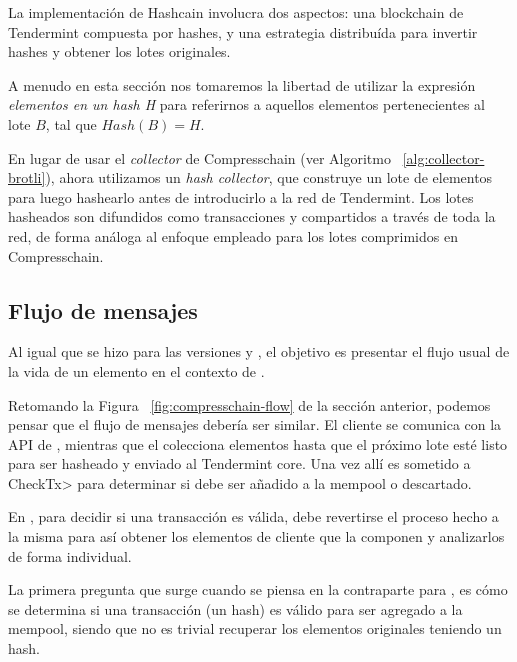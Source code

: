 %
La implementación de Hashcain involucra dos aspectos: una blockchain de Tendermint compuesta por hashes,
y una estrategia distribuída para invertir hashes y obtener los lotes originales.
%

A menudo en esta sección nos tomaremos la libertad de utilizar la expresión \textit{elementos en un hash H}
para referirnos a aquellos elementos pertenecientes al lote $B$, tal que $Hash(B) = H$.

En lugar de usar el \textit{collector} de Compresschain (ver Algoritmo ~\ref{alg:collector-brotli}),
ahora utilizamos un \textit{hash collector}, que construye un lote de elementos para luego hashearlo
antes de introducirlo a la red de Tendermint.
%
Los lotes hasheados son difundidos como transacciones y compartidos a través de toda la red, de forma
análoga al enfoque empleado para los lotes comprimidos en Compresschain.

\subsection{Flujo de mensajes}

Al igual que se hizo para las versiones \vanilla y \compresschain, el objetivo es presentar el flujo usual
de la vida de un elemento en el contexto de \hashchain.

%

Retomando la Figura ~\ref{fig:compresschain-flow} de la sección anterior, podemos pensar que el flujo de mensajes
debería ser similar. El cliente se comunica con la API de \setchain, mientras que el \collector colecciona elementos
hasta que el próximo lote esté listo para ser hasheado y enviado al Tendermint core.
Una vez allí es sometido a
\<CheckTx> para determinar si debe ser añadido a la mempool o descartado.

%

En \compresschain, para decidir si una transacción es válida, debe revertirse el proceso hecho a la misma para
así obtener los elementos de cliente que la componen y analizarlos de forma individual.

%

La primera pregunta que surge cuando se piensa en la contraparte para \hashchain, es cómo se determina si una
transacción (un hash) es válido para ser agregado a la mempool, siendo que no es trivial recuperar los
elementos originales teniendo un hash.

